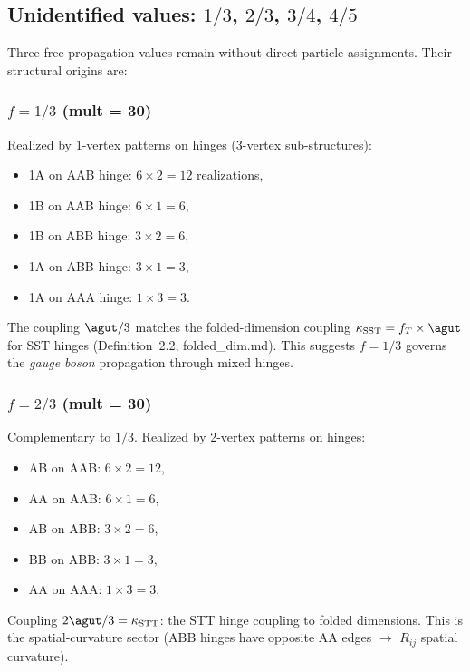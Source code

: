\subsection{Unidentified values: $1/3$, $2/3$, $3/4$, $4/5$}
\label{sec:unidentified}

Three free-propagation values remain without direct particle assignments.  Their structural origins are:

\subsubsection{$f = 1/3$ (mult = 30)}

Realized by 1-vertex patterns on hinges (3-vertex sub-structures):
\begin{itemize}
\item 1A on AAB hinge: $6 \times 2 = 12$ realizations,
\item 1B on AAB hinge: $6 \times 1 = 6$,
\item 1B on ABB hinge: $3 \times 2 = 6$,
\item 1A on ABB hinge: $3 \times 1 = 3$,
\item 1A on AAA hinge: $1 \times 3 = 3$.
\end{itemize}
The coupling $\agut/3$ matches the folded-dimension coupling $\kappa_\mathrm{SST} = f_T \times \agut$ for SST hinges (Definition~2.2, folded\_dim.md).  This suggests $f = 1/3$ governs the \emph{gauge boson} propagation through mixed hinges.

\subsubsection{$f = 2/3$ (mult = 30)}

Complementary to $1/3$.  Realized by 2-vertex patterns on hinges:
\begin{itemize}
\item AB on AAB: $6 \times 2 = 12$,
\item AA on AAB: $6 \times 1 = 6$,
\item AB on ABB: $3 \times 2 = 6$,
\item BB on ABB: $3 \times 1 = 3$,
\item AA on AAA: $1 \times 3 = 3$.
\end{itemize}
Coupling $2\agut/3 = \kappa_\mathrm{STT}$: the STT hinge coupling to folded dimensions.  This is the spatial-curvature sector (ABB hinges have opposite AA edges $\to$ $R_{ij}$ spatial curvature).

